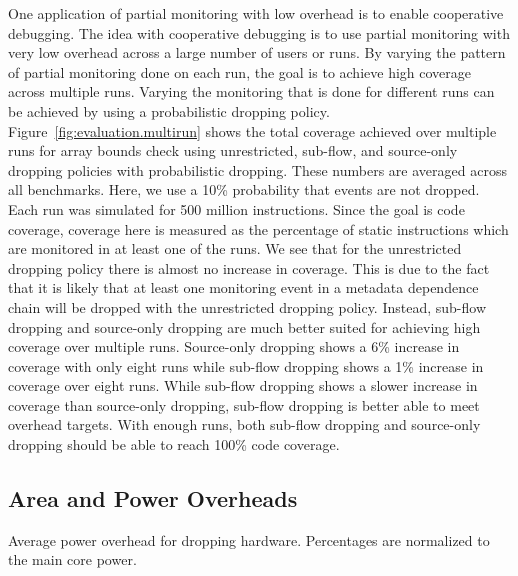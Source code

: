 One application of partial monitoring with low overhead is to enable
cooperative debugging. 
The idea with cooperative debugging is to use partial
monitoring with very low overhead across a large number of users or runs. By
varying the pattern of partial monitoring done on each run, the goal is to
achieve high coverage across multiple runs. Varying the monitoring that is
done for different runs can be achieved by using a probabilistic dropping policy.
Figure~\ref{fig:evaluation.multirun} shows the total
coverage achieved over multiple runs for array bounds check using
unrestricted, sub-flow, and source-only dropping policies with probabilistic dropping.
These numbers are averaged across all benchmarks. Here, we use a 10\%
probability
that events are not dropped.  Each run
was simulated for 500 million instructions. 
Since the goal is code coverage, coverage here is
measured as the percentage of static instructions which are monitored in at
least one of the runs.
We see that for the unrestricted dropping policy there is almost no increase in
coverage.  This is due to the fact that it is likely that at least one
monitoring event in a metadata dependence chain will be dropped with the unrestricted dropping
policy. 
Instead, sub-flow dropping and source-only
dropping are much better suited for achieving high coverage over multiple runs.
Source-only dropping shows a 6\% increase in coverage with only eight runs
while sub-flow dropping shows a 1\% increase in coverage over eight runs.
While sub-flow dropping shows a slower increase in coverage than source-only
dropping, sub-flow dropping is better able to meet overhead targets.
With enough runs, both sub-flow dropping and source-only dropping should be able to
reach 100\% code coverage.

\subsection{Area and Power Overheads}

\begin{table}[tb]
  \begin{center}
    \vspace{-0.0in}
    \begin{footnotesize}
    
    \end{footnotesize}
    \caption{Average power overhead for dropping hardware. Percentages 
    are normalized to the main core power.}
    \vspace{-0.2in}
    \label{tab:evaluation.area_power}
  \end{center}
\end{table}

